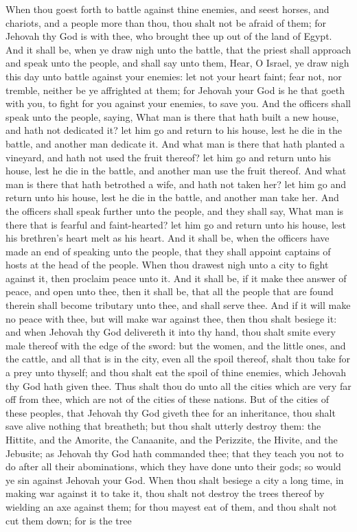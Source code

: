 When thou goest forth to battle against thine enemies, and seest horses, and chariots, and a people more than thou, thou shalt not be afraid of them; for Jehovah thy God is with thee, who brought thee up out of the land of Egypt. And it shall be, when ye draw nigh unto the battle, that the priest shall approach and speak unto the people, and shall say unto them, Hear, O Israel, ye draw nigh this day unto battle against your enemies: let not your heart faint; fear not, nor tremble, neither be ye affrighted at them; for Jehovah your God is he that goeth with you, to fight for you against your enemies, to save you. And the officers shall speak unto the people, saying, What man is there that hath built a new house, and hath not dedicated it? let him go and return to his house, lest he die in the battle, and another man dedicate it. And what man is there that hath planted a vineyard, and hath not used the fruit thereof? let him go and return unto his house, lest he die in the battle, and another man use the fruit thereof. And what man is there that hath betrothed a wife, and hath not taken her? let him go and return unto his house, lest he die in the battle, and another man take her. And the officers shall speak further unto the people, and they shall say, What man is there that is fearful and faint-hearted? let him go and return unto his house, lest his brethren’s heart melt as his heart. And it shall be, when the officers have made an end of speaking unto the people, that they shall appoint captains of hosts at the head of the people.  When thou drawest nigh unto a city to fight against it, then proclaim peace unto it. And it shall be, if it make thee answer of peace, and open unto thee, then it shall be, that all the people that are found therein shall become tributary unto thee, and shall serve thee. And if it will make no peace with thee, but will make war against thee, then thou shalt besiege it: and when Jehovah thy God delivereth it into thy hand, thou shalt smite every male thereof with the edge of the sword: but the women, and the little ones, and the cattle, and all that is in the city, even all the spoil thereof, shalt thou take for a prey unto thyself; and thou shalt eat the spoil of thine enemies, which Jehovah thy God hath given thee. Thus shalt thou do unto all the cities which are very far off from thee, which are not of the cities of these nations. But of the cities of these peoples, that Jehovah thy God giveth thee for an inheritance, thou shalt save alive nothing that breatheth; but thou shalt utterly destroy them: the Hittite, and the Amorite, the Canaanite, and the Perizzite, the Hivite, and the Jebusite; as Jehovah thy God hath commanded thee; that they teach you not to do after all their abominations, which they have done unto their gods; so would ye sin against Jehovah your God.  When thou shalt besiege a city a long time, in making war against it to take it, thou shalt not destroy the trees thereof by wielding an axe against them; for thou mayest eat of them, and thou shalt not cut them down; for is the tree 